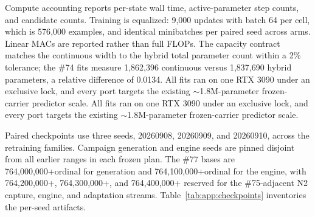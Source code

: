 Compute accounting reports per-state wall time, active-parameter step counts, and candidate counts. Training is equalized: 9{,}000 updates with batch 64 per cell, which is 576{,}000 examples, and identical minibatches per paired seed across arms. Linear MACs are reported rather than full FLOPs. The capacity contract matches the continuous width to the hybrid total parameter count within a 2\% tolerance; the \#74 fits measure 1{,}862{,}396 continuous versus 1{,}837{,}690 hybrid parameters, a relative difference of 0.0134. All fits ran on one RTX 3090 under an exclusive lock, and every port targets the existing $\sim$1.8M-parameter frozen-carrier predictor scale. All fits ran on one RTX 3090 under an exclusive lock, and every port targets the existing $\sim$1.8M-parameter frozen-carrier predictor scale.

Paired checkpoints use three seeds, 20260908, 20260909, and 20260910, across the retraining families. Campaign generation and engine seeds are pinned disjoint from all earlier ranges in each frozen plan. The \#77 bases are 764{,}000{,}000+ordinal for generation and 764{,}100{,}000+ordinal for the engine, with 764{,}200{,}000+, 764{,}300{,}000+, and 764{,}400{,}000+ reserved for the \#75-adjacent N2 capture, engine, and adaptation streams. Table~\ref{tab:app:checkpoints} inventories the per-seed artifacts.


